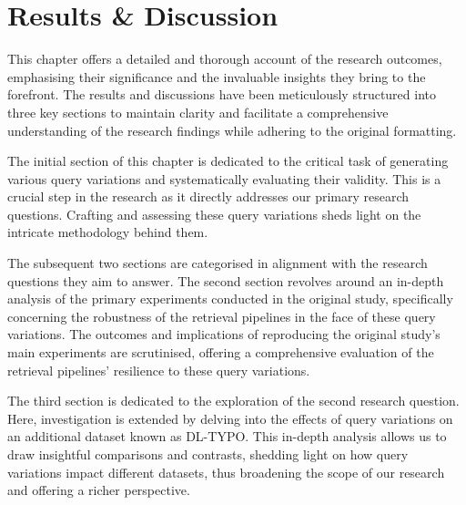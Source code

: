 \chapter{Results \& Discussion}
This chapter offers a detailed and thorough account of the research outcomes, emphasising their significance and the invaluable insights they bring to the forefront. The results and discussions have been meticulously structured into three key sections to maintain clarity and facilitate a comprehensive understanding of the research findings while adhering to the original formatting.

The initial section of this chapter is dedicated to the critical task of generating various query variations and systematically evaluating their validity. This is a crucial step in the research as it directly addresses our primary research questions. Crafting and assessing these query variations sheds light on the intricate methodology behind them.

The subsequent two sections are categorised in alignment with the research questions they aim to answer. The second section revolves around an in-depth analysis of the primary experiments conducted in the original study, specifically concerning the robustness of the retrieval pipelines in the face of these query variations. The outcomes and implications of reproducing the original study's main experiments are scrutinised, offering a comprehensive evaluation of the retrieval pipelines' resilience to these query variations.

The third section is dedicated to the exploration of the second research question. Here, investigation is extended by delving into the effects of query variations on an additional dataset known as DL-TYPO. This in-depth analysis allows us to draw insightful comparisons and contrasts, shedding light on how query variations impact different datasets, thus broadening the scope of our research and offering a richer perspective.




